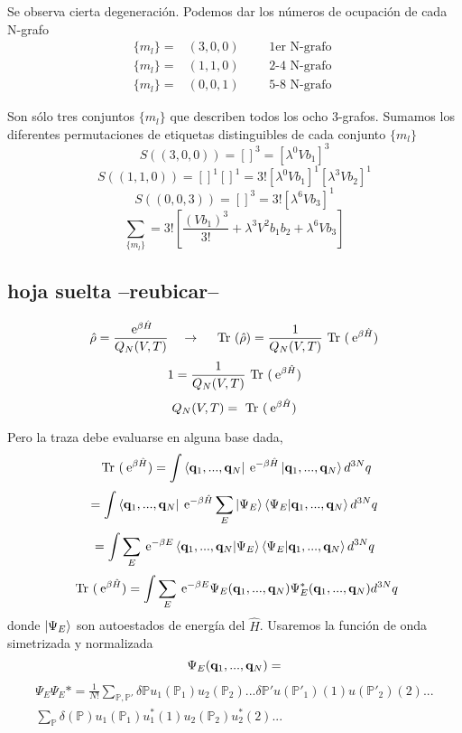 \documentclass[10pt,oneside]{CBFT_book}
\begin{document}
Se observa cierta degeneración. Podemos dar los números de ocupación de cada N-grafo
\[
\begin{aligned}
	\{ m_l \} = & (3,0,0) \qquad \text{ 1er N-grafo } \\
	\{ m_l \} = & (1,1,0) \qquad \text{ 2-4 N-grafo } \\
	\{ m_l \} = & (0,0,1) \qquad \text{ 5-8 N-grafo }
\end{aligned}
\]

Son sólo tres conjuntos $\{ m_l \}$ que describen todos los ocho 3-grafos. Sumamos los diferentes permutaciones de 
etiquetas distinguibles de cada conjunto $\{ m_l \}$
\[
	S((3,0,0)) = [  ]^3 = [\lambda^0 V b_1 ]^3
\]
\[
	S((1,1,0)) = []^1[]^1 = 3! [\lambda^0 V b_1 ]^1 [\lambda^3 V b_2 ]^1
\]
\[
	S((0,0,3)) = []^3 = 3! [\lambda^6 V b_3 ]^1
\]
\[
	\sum_{ \{ m_l \} } = 3! \left[ \frac{(V b_1)^3}{3!} + \lambda^3 V^2 b_1 b_2 + \lambda^6 V b_3 \right]
\]

\subsection{hoja suelta --reubicar--}
\[
	\hat{\rho} = \frac{\:\mathrm{e}^{\beta \hat{H}}}{Q_N(V,T)} \quad \rightarrow \quad 
	\text{ Tr }(\hat{\rho}) = \frac{1}{Q_N(V,T)} \text{ Tr }(\:\mathrm{e}^{\beta \hat{H}})
\]
\[
	1 =  \frac{1}{Q_N(V,T)} \text{ Tr }(\:\mathrm{e}^{\beta \hat{H}})
\]
\[
	Q_N(V,T) = \text{ Tr }(\:\mathrm{e}^{\beta \hat{H}})
\]

Pero la traza debe evaluarse en alguna base dada,
\[
	\text{ Tr }(\euler^{\beta \hat{H}}) = 
	\int \Bra{\vb{q}_1,..., \vb{q}_N} \euler^{-\beta \hat{H}} \Ket{\vb{q}_1,..., \vb{q}_N} d^{3N}q
\]
\[
	= \int \Bra{\vb{q}_1,..., \vb{q}_N} \euler^{-\beta \hat{H}} 
	\sum_E \Ket{\Psi_E} \braket{\Psi_E | \vb{q}_1,..., \vb{q}_N} d^{3N}q
\]
\[
	= \int  \sum_E \euler^{ -\beta E }  \braket{\vb{q}_1,..., \vb{q}_N | \Psi_E} 
	\braket{\Psi_E | \vb{q}_1,..., \vb{q}_N} d^{3N}q
\]
\[
	\text{ Tr }(\euler^{\beta \hat{H}}) = 
	\int \sum_E \euler^{ -\beta E }  \Psi_E (\vb{q}_1,..., \vb{q}_N ) 
	\Psi_E^*(\vb{q}_1,..., \vb{q}_N ) d^{3N}q
\]
donde $\Ket{\Psi_E}$ son autoestados de energía del $\hat{H}$. Usaremos la función de onda simetrizada y normalizada
\[
	\Psi_E (\vb{q}_1,..., \vb{q}_N )  =
\]
\begin{multline*}
	\Psi_E \Psi_E* = \frac{1}{N!} \sum_{\mathbb{P},\mathbb{P}'} \delta \mathbb{P} u_1(\mathbb{P}_1)
	u_2(\mathbb{P}_2) ... \delta \mathbb{P}' u(\mathbb{P}'_1)(1) u(\mathbb{P}'_2) (2) ... \\
	\sum_{\mathbb{P}} \delta(\mathbb{P}) u_1(\mathbb{P}_1) u_1^*(1) u_2(\mathbb{P}_2) u_2^*(2) ...
\end{multline*}
\end{document}
